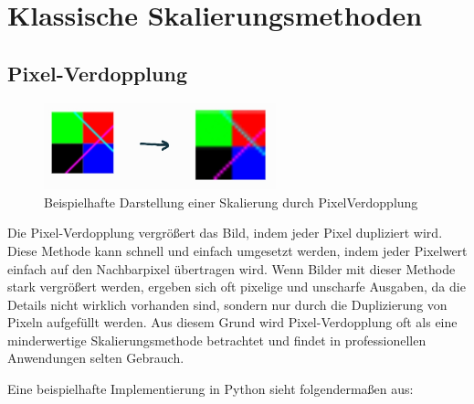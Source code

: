 \chapter{Klassische Skalierungsmethoden}

    \section{Pixel-Verdopplung}

        \begin{figure}[h]
            \centering
            \includegraphics[width=0.6\textwidth]{img/so_sieht_pixel_verdopplung_aus.jpg}
            \caption{Beispielhafte Darstellung einer Skalierung durch PixelVerdopplung}
            \label{fig:beispielhafte_darstellung_einer_skalierung_durch_pixelverdopplung}
        \end{figure}

        Die Pixel-Verdopplung vergrößert das Bild, indem jeder Pixel dupliziert wird.
        Diese Methode kann schnell und einfach umgesetzt werden, indem jeder Pixelwert einfach auf den Nachbarpixel übertragen wird.
        Wenn Bilder mit dieser Methode stark vergrößert werden, ergeben sich oft pixelige und unscharfe Ausgaben, da die Details nicht wirklich vorhanden sind, sondern nur durch die Duplizierung von Pixeln aufgefüllt werden. 
        Aus diesem Grund wird Pixel-Verdopplung oft als eine minderwertige Skalierungsmethode betrachtet und findet in professionellen Anwendungen selten Gebrauch.~


    \newpage
    Eine beispielhafte Implementierung in Python sieht folgendermaßen aus:
    
